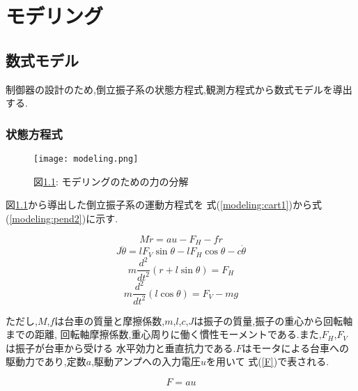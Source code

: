 \chapter{モデリング}
\label{chapter_modeling}
\section{数式モデル}
制御器の設計のため,倒立振子系の状態方程式,観測方程式から数式モデルを導出する.

\subsection{状態方程式}

\begin{figure}[htbp]
    \begin{center}
        \texttt{[image: modeling.png]}
        \caption{図\ref{modeling}: モデリングのための力の分解}
        \label{modeling}
    \end{center}
\end{figure}

図\ref{modeling}から導出した倒立振子系の運動方程式を
式(\ref{modeling:cart1})から式(\ref{modeling:pend2})に示す.

\begin{equation}
    M \ddot{r} = au - F_{H} - f \dot{r}
    \label{modeling:cart1}
\end{equation}
\begin{equation}
    J \ddot{\theta} = lF_{V}\sin{\theta} - lF_{H}\cos{\theta} - c \dot{\theta}
    \label{modeling:pend1}
\end{equation}
\begin{equation}
    m\frac{d^2}{dt^2}(r + l\sin{\theta}) = F_{H}
    \label{modeling:cart2}
\end{equation}
\begin{equation}
    m\frac{d^2}{dt^2}(l\cos{\theta}) = F_{V} - mg
    \label{modeling:pend2}
\end{equation}

ただし,$M$,$f$は台車の質量と摩擦係数,$m$,$l$,$c$,$J$は振子の質量,振子の重心から回転軸までの距離,
回転軸摩擦係数,重心周りに働く慣性モーメントである.また,$F_{H}$,$F_{V}$は振子が台車から受ける
水平効力と垂直抗力である.$F$はモータによる台車への駆動力であり,定数$a$,駆動アンプへの入力電圧$u$を用いて
式(\ref{F})で表される.

\begin{equation}
    F = au
    \label{F}
\end{equation}


